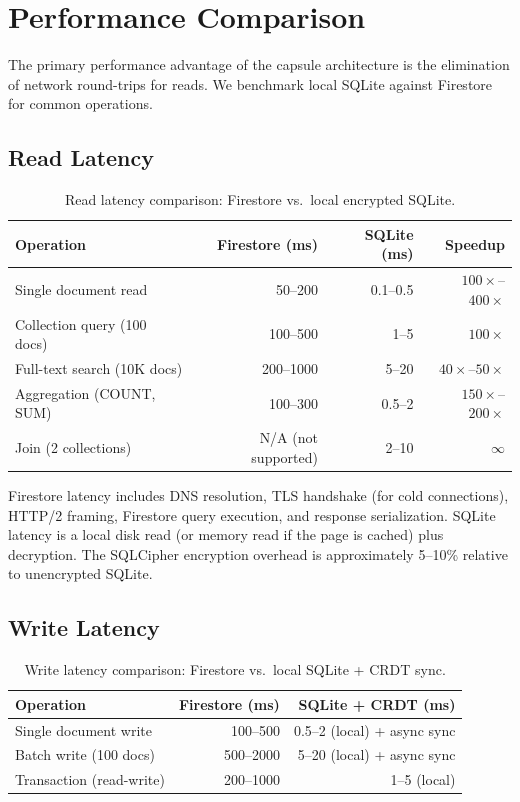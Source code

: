 \section{Performance Comparison}
\label{sec:performance}

The primary performance advantage of the capsule architecture is the
elimination of network round-trips for reads. We benchmark local SQLite
against Firestore for common operations.

\subsection{Read Latency}

\begin{table}[H]
\centering
\caption{Read latency comparison: Firestore vs.\ local encrypted SQLite.}
\label{tab:read-latency}
\begin{tabular}{lrrr}
\toprule
\textbf{Operation} & \textbf{Firestore (ms)} & \textbf{SQLite (ms)} & \textbf{Speedup} \\
\midrule
Single document read & 50--200 & 0.1--0.5 & $100\times$--$400\times$ \\
Collection query (100 docs) & 100--500 & 1--5 & $100\times$ \\
Full-text search (10K docs) & 200--1000 & 5--20 & $40\times$--$50\times$ \\
Aggregation (COUNT, SUM) & 100--300 & 0.5--2 & $150\times$--$200\times$ \\
Join (2 collections) & N/A (not supported) & 2--10 & $\infty$ \\
\bottomrule
\end{tabular}
\end{table}

Firestore latency includes DNS resolution, TLS handshake (for cold
connections), HTTP/2 framing, Firestore query execution, and response
serialization. SQLite latency is a local disk read (or memory read if
the page is cached) plus decryption. The SQLCipher encryption overhead
is approximately 5--10\% relative to unencrypted SQLite.

\subsection{Write Latency}

\begin{table}[H]
\centering
\caption{Write latency comparison: Firestore vs.\ local SQLite + CRDT sync.}
\label{tab:write-latency}
\begin{tabular}{lrr}
\toprule
\textbf{Operation} & \textbf{Firestore (ms)} & \textbf{SQLite + CRDT (ms)} \\
\midrule
Single document write & 100--500 & 0.5--2 (local) + async sync \\
Batch write (100 docs) & 500--2000 & 5--20 (local) + async sync \\
Transaction (read-write) & 200--1000 & 1--5 (local) \\
\bottomrule
\end{tabular}
\end{table}

